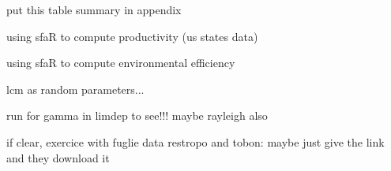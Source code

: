 \documentclass[nojss]{jss}
\begin{document}
put this table summary in appendix


using sfaR to compute productivity (us states data)


using sfaR to compute environmental efficiency

lcm as random parameters...

run for gamma in limdep to see!!!
maybe rayleigh also

if clear, exercice with fuglie data
restropo and tobon: maybe just give the link and they download it





\newpage
\end{document}
